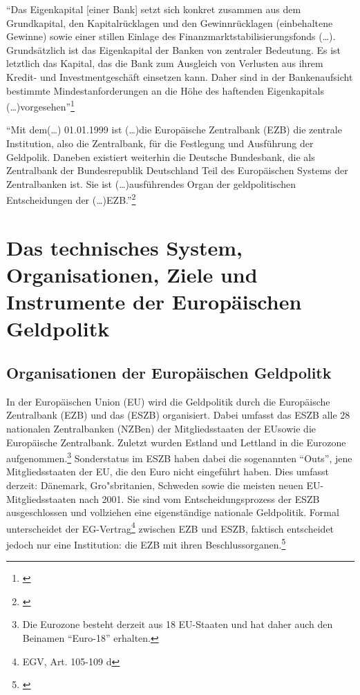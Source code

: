 \documentclass[
        onecolumn,
        a4paper,
        abstracton,
        parskip=half
        ,final
        ]{scrartcl}
\begin{document}
"`Das Eigenkapital [einer Bank] setzt sich konkret zusammen aus dem Grundkapital, den Kapitalr{\"u}cklagen und den Gewinnr{\"u}cklagen (einbehaltene Gewinne) sowie einer stillen Einlage des Finanzmarktstabilisierungsfonds (\ldots). Grunds{\"a}tzlich ist das Eigenkapital der Banken von zentraler Bedeutung. Es ist letztlich das Kapital, das die Bank zum Ausgleich von Verlusten aus ihrem Kredit- und Investmentgesch{\"a}ft einsetzen kann.  Daher sind in der Bankenaufsicht bestimmte Mindestanforderungen an die H{\"o}he des haftenden Eigenkapitals (\ldots)vorgesehen"'\footnote[28]{\citep*[vgl.][S.515]{Basseler2010}}
 
"`Mit dem(\ldots) 01.01.1999 ist (\ldots)die Europ{\"a}ische Zentralbank (EZB) die zentrale Institution, also die Zentralbank, f{\"u}r die Festlegung und Ausf{\"u}hrung der Geldpolik. Daneben existiert weiterhin die Deutsche Bundesbank, die als Zentralbank der Bundesrepublik Deutschland Teil des Europ{\"a}ischen Systems der Zentralbanken ist. Sie ist (\ldots)ausf{\"u}hrendes Organ der geldpolitischen Entscheidungen der (\ldots)EZB."'\footnote[29]{\citep*[vgl.][S.512]{Basseler2010} }
\clearpage


\section{Das technisches System, Organisationen, Ziele und Instrumente der Europ{\"a}ischen Geldpolitk}
  \label{sec2:technischesSystem}

\subsection{Organisationen der Europ{\"a}ischen Geldpolitk}

In der Europ{\"a}ischen Union (EU) wird die Geldpolitik durch die Europ{\"a}ische Zentralbank (EZB) und das (\ac{ESZB}) organisiert. Dabei umfasst das ESZB alle 28 nationalen Zentralbanken (NZBen) der Mitgliedsstaaten der \ac{EU}sowie die Europ{\"a}ische Zentralbank. Zuletzt wurden Estland und Lettland in die Eurozone aufgenommen.\footnote[30]{Die Eurozone besteht derzeit aus 18 EU-Staaten und hat daher auch den Beinamen "`Euro-18"' erhalten.} Sonderstatus im ESZB haben dabei die sogenannten "`Outs"', jene Mitgliedsstaaten der EU, die den Euro nicht eingef{\"u}hrt haben.
Dies umfasst derzeit: D{\"a}nemark, Gro{"s}britanien, Schweden sowie die meisten neuen EU-Mitgliedsstaaten nach 2001. Sie sind vom Entscheidungsprozess der ESZB ausgeschlossen und vollziehen eine eigenst{\"a}ndige nationale Geldpolitik.
Formal unterscheidet der EG-Vertrag\footnote[31]{\ac{EGV}, Art. 105-109 d} zwischen EZB und ESZB, faktisch entscheidet jedoch nur eine Institution: die EZB mit ihren Beschlussorganen.\footnote[32]{\citep*[vgl.][S.553]{Basseler2010}}
\end{document}
